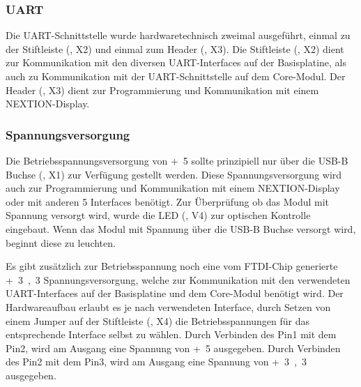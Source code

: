 \subsubsection{UART}
Die UART-Schnittstelle wurde hardwaretechnisch zweimal ausgeführt, einmal zu der Stiftleiste (, X2) und einmal zum Header (, X3). Die Stiftleiste (, X2) dient zur Kommunikation mit den diversen UART-Interfaces auf der \gls{Basisplatine}, als auch zu Kommunikation mit der UART-Schnittstelle auf dem \gls{Core-Modul}. Der Header (, X3) dient zur Programmierung und Kommunikation mit einem NEXTION-Display.


\subsubsection{Spannungsversorgung}
Die Betriebsspannungsversorgung von \unit{+5}{\volt} sollte prinzipiell nur über die USB-B Buchse (, X1) zur Verfügung gestellt werden. Diese Spannungsversorgung wird auch zur Programmierung und Kommunikation mit einem NEXTION-Display oder mit anderen \unit{5}{\volt} Interfaces benötigt. Zur Überprüfung ob das Modul mit Spannung versorgt wird, wurde die LED (, V4) zur optischen Kontrolle eingebaut. Wenn das Modul mit Spannung über die USB-B Buchse versorgt wird, beginnt diese zu leuchten.

Es gibt zusätzlich zur Betriebsspannung noch eine vom FTDI-Chip generierte \unit{+3,3}{\volt} Spannungsversorgung, welche zur Kommunikation mit den verwendeten UART-Interfaces auf der \gls{Basisplatine} und dem \gls{Core-Modul} benötigt wird. Der Hardwareaufbau erlaubt es je nach verwendeten Interface, durch Setzen von einem Jumper auf der Stiftleiste (, X4) die Betriebsspannungen für das entsprechende Interface selbst zu wählen. Durch Verbinden des Pin1 mit dem Pin2, wird am Ausgang eine Spannung von \unit{+5}{\volt} ausgegeben. Durch Verbinden des Pin2 mit dem Pin3, wird am Ausgang eine Spannung von \unit{+3,3}{\volt} ausgegeben.


